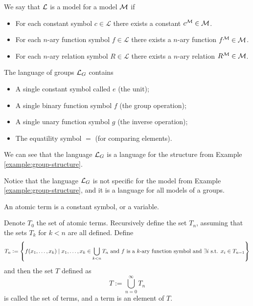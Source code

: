 \documentclass[11pt,a4paper]{article}
\begin{document}
  \begin{definition}
    We say that $\mathcal{L}$ is a model for a model $\mathcal{M}$ if
    \begin{itemize}
      \item For each constant symbol $c \in \mathcal L$ there exists a constant
        $c^{\mathcal{M}} \in \mathcal{M}$.
      \item For each $n$-ary function symbol $f \in \mathcal L$ there exists 
        a $n$-ary function $f^{\mathcal{M}} \in \mathcal{M}$.
      \item For each $n$-ary relation symbol $R \in \mathcal L$ there exists 
        a $n$-ary relation $R^{\mathcal{M}} \in \mathcal{M}$.
    \end{itemize}
  \end{definition}

  \begin{example}
    The language of groups $\mathcal{L}_G$ contains
    \begin{itemize}
      \item A single constant symbol called $e$ (the unit);
      \item A single binary function symbol $f$ (the group operation);
      \item A single unary function symbol $g$ (the inverse operation);
      \item The equatility symbol $=$ (for comparing elements).
    \end{itemize}
    We can see that the language $\mathcal{L}_G$ is a language for the structure
    from Example \ref{example:group-structure}.
  \end{example}
  \begin{remark}
    Notice that the language $\mathcal{L}_G$ is not specific for the model from
    Example \ref{example:group-structure}, and it is a language for
    all models of a groups.
  \end{remark}

  \begin{definition}
    An atomic term is a constant symbol, or a variable.
  \end{definition}

  \begin{definition}[Term]
    Denote $T_0$ the set of atomic terms.
    Recursively define the set $T_n$, assuming that the sets $T_k$ for $k < n$
    are all defined. Define
    \[
      T_n := \set{f(x_1,\dots,x_k) \mid
      x_1,\dots,x_k \in \bigcup_{k < n} T_n \text{ and $f$ is a $k$-ary 
      function symbol and } \exists i \text{ s.t. }x_i \in T_{n-1}}
    \]
    and then the set $T$ defined as
    \[
      T := \bigcup_{n=0}^{\infty} T_n
    \]
    is called the set of terms, and a term is an element of $T$.
  \end{definition}
\end{document}
